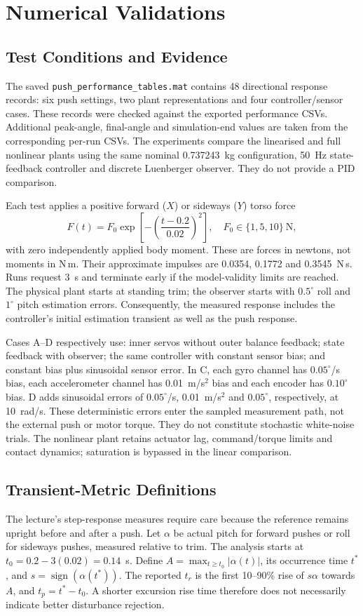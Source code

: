 \section{Numerical Validations}
\label{sec:numerical_validations}
\subsection{Test Conditions and Evidence}
The saved \texttt{push\_performance\_tables.mat} contains 48 directional response records: six push settings, two plant representations and four controller/sensor cases. These records were checked against the exported performance CSVs. Additional peak-angle, final-angle and simulation-end values are taken from the corresponding per-run CSVs. The experiments compare the linearised and full nonlinear plants using the same nominal 0.737243~kg configuration, 50~Hz state-feedback controller and discrete Luenberger observer. They do not provide a PID comparison.

Each test applies a positive forward ($X$) or sideways ($Y$) torso force
\[
F(t)=F_0\exp\!\left[-\left(\frac{t-0.2}{0.02}\right)^2\right],
\quad F_0\in\{1,5,10\}\ \mathrm{N},
\]
with zero independently applied body moment. These are forces in newtons, not moments in N\,m. Their approximate impulses are 0.0354, 0.1772 and 0.3545~N\,s. Runs request 3~s and terminate early if the model-validity limits are reached. The physical plant starts at standing trim; the observer starts with $0.5^\circ$ roll and $1^\circ$ pitch estimation errors. Consequently, the measured response includes the controller's initial estimation transient as well as the push response.

Cases A--D respectively use: inner servos without outer balance feedback; state feedback with observer; the same controller with constant sensor bias; and constant bias plus sinusoidal sensor error. In C, each gyro channel has $0.05^\circ$/s bias, each accelerometer channel has 0.01~m/s$^2$ bias and each encoder has $0.10^\circ$ bias. D adds sinusoidal errors of $0.05^\circ$/s, 0.01~m/s$^2$ and $0.05^\circ$, respectively, at 10~rad/s. These deterministic errors enter the sampled measurement path, not the external push or motor torque. They do not constitute stochastic white-noise trials. The nonlinear plant retains actuator lag, command/torque limits and contact dynamics; saturation is bypassed in the linear comparison.

\subsection{Transient-Metric Definitions}
The lecture's step-response measures require care because the reference remains upright before and after a push. Let $\alpha$ be actual pitch for forward pushes or roll for sideways pushes, measured relative to trim. The analysis starts at $t_0=0.2-3(0.02)=0.14$~s. Define $A=\max_{t\ge t_0}|\alpha(t)|$, its occurrence time $t^*$, and $s=\operatorname{sign}(\alpha(t^*))$. The reported $t_r$ is the first 10--90\% rise of $s\alpha$ towards $A$, and $t_p=t^*-t_0$. A shorter excursion rise time therefore does not necessarily indicate better disturbance rejection.

